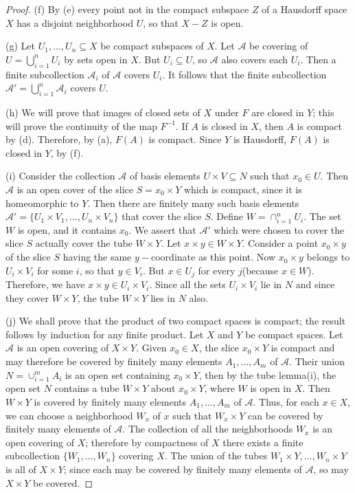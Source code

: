 \documentclass[11pt,a4paper]{article}
\begin{document}
\begin{proof}
\noindent(f) By (e) every point not in the compact subspace $Z$ of a Hausdorff space $X$ has a disjoint neighborhood $U$, so that $X-Z$ is open.

\noindent(g) Let $U_1,\ldots,U_n\subseteq X$ be compact subspaces of $X$. Let $\mathcal{A}$ be covering of $U = \bigcup_{i=1}^n U_i$ by sets open in $X$. But $U_i\subseteq U$, so $\mathcal{A}$ also covers each $U_i$. Then a finite subcollection $\mathcal{A}_i$ of $\mathcal{A}$ covers $U_i$. It follows that the finite subcollection $\mathcal{A}' = \bigcup_{i=1}^n \mathcal{A}_i$ covers $U$.

\noindent(h) We will prove that images of closed sets of $X$ under $F$ are closed in $Y$; this will prove the continuity of the map $F^{-1}$. If $A$ is closed in $X$, then $A$ is compact by (d). Therefore, by (a), $F(A)$ is compact. Since $Y$ is Hausdorff, $F(A)$ is closed in $Y$, by (f).

\noindent(i) Consider the collection $\mathcal{A}$ of basis elements $U\times V\subseteq N$ such that $x_0\in U$. Then $\mathcal{A}$ is an open cover of the slice $S = x_0\times Y$ which is compact, since it is homeomorphic to $Y$. Then there are finitely many such basis elements $\mathcal{A}' = \{U_1\times V_1,\ldots,U_n\times V_n\}$ that cover the slice $S$. Define $W = \cap_{i=1}^n U_i$. The set $W$ is open, and it contains $x_0$. We assert that $\mathcal{A}'$ which were chosen to cover the slice $S$ actually cover the tube $W\times Y$. Let $x\times y\in W\times Y$. Consider a point $x_0\times y$ of the slice $S$ having the same $y-$coordinate as this point. Now $x_0\times y$ belongs to $U_i\times V_i$ for some $i$, so that $y\in V_i$. But $x\in U_j$ for every $j$(because $x\in W$). Therefore, we have $x\times y\in U_i\times V_i$. Since all the sets $U_i\times V_i$ lie in $N$ and since they cover $W\times Y$, the tube $W\times Y$ lies in $N$ also. 

\noindent(j) We shall prove that the product of two compact spaces is compact; the result follows by induction for any finite product. Let $X$ and $Y$ be compact spaces. Let $\mathcal{A}$ is an open covering of $X\times Y$. Given $x_0\in X$, the slice $x_0\times Y$ is compact and may therefore be covered by finitely many elements $A_1,\ldots,A_m$ of $\mathcal{A}$. Their union $N = \cup_{i=1}^m A_i$ is an open set containing $x_0\times Y$, then by the tube lemma(i), the open set $N$ contains a tube $W\times Y$ about $x_0\times Y$, where $W$ is open in $X$. Then $W\times Y$ is covered by finitely many elements $A_1,\ldots,A_m$ of $\mathcal{A}$. Thus, for each $x\in X$, we can choose a neighborhood $W_x$ of $x$ such that $W_x\times Y$ can be covered by finitely many elements of $\mathcal{A}$. The collection of all the neighborhoods $W_x$ is an open covering of $X$; therefore by compactness of $X$ there exists a finite subcollection $\{W_1,\ldots,W_n\}$ covering $X$. The union of the tubes $W_1\times Y,\ldots, W_n\times Y$ is all of $X\times Y$; since each may be covered by finitely many elements of $\mathcal{A}$, so may $X\times Y$ be covered.


\end{proof}
\end{document}

